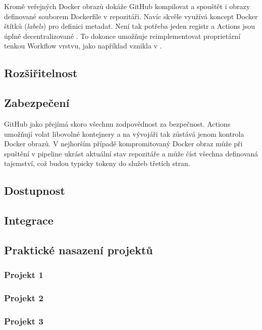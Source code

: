         Kromě veřejných Docker obrazů dokáže GitHub kompilovat a spouštět i obrazy definované souborem Dockerfile v repozitáři. Navíc skvěle využívá koncept Docker štítků (\textit{labels}) pro definici metadat. Není tak potřeba jeden registr a Actions jsou úplně decentralizované \cite{ga-labels}. To dokonce umožňuje reimplementovat proprietární tenkou Workflow vrstvu, jako například vznikla v  \cite{nektos-act}.

    \subsection{Rozšiřitelnost}
        \blind[1]

    \subsection{Zabezpečení}
        GitHub jako  přejímá skoro všechnu zodpovědnost za bezpečnost. Actions umožňují volat libovolné kontejnery a na vývojáři tak zůstává jenom kontrola Docker obrazů. V nejhorším případě kompromitovaný Docker obraz může při spuštění v pipeline ukrást aktuální stav repozitáře a může číst všechna definovaná tajemství, což budou typicky tokeny do služeb třetích stran.

    \subsection{Dostupnost}
        \blind[1]

    \subsection{Integrace}
        \blind[1]
        \blind[1]

    \subsection{Praktické nasazení projektů}
        \subsubsection{Projekt 1}
            \blind[1]

        \subsubsection{Projekt 2}
            \blind[1]

        \subsubsection{Projekt 3}
            \blind[1]

